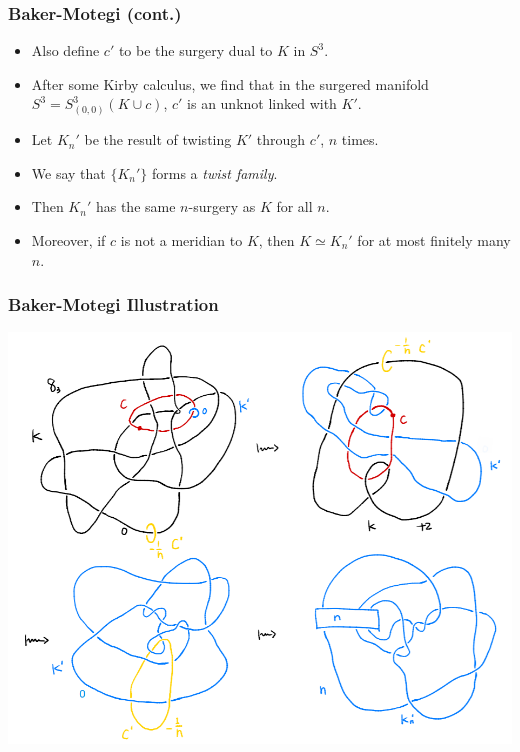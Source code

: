 \documentclass{beamer}
\theoremstyle{ex}
\theoremstyle{rem}
\begin{document}
	\begin{frame}
		\frametitle{Baker-Motegi (cont.)}
		\begin{itemize}
			
			\item Also define $c'$ to be the surgery dual to $K$ in $S^3$.
			
			\item After some Kirby calculus, we find that in the surgered manifold $S^3=S^3_{(0,0)}(K\cup c)$, $c'$ is an unknot linked with $K'$.
			
			\item Let $K_n'$ be the result of twisting $K'$ through $c'$, $n$ times.
			
			\item We say that $\{K_n'\}$ forms a \textit{twist family}.
			
			\item Then $K_n'$ has the same $n$-surgery as $K$ for all $n$.
			
			\item Moreover, if $c$ is not a meridian to $K$, then $K\simeq K_n'$ for at most finitely many $n$.
		\end{itemize}
	\end{frame}

	\begin{frame}
		\frametitle{Baker-Motegi Illustration}
		\begin{center}
			\includegraphics[scale=0.5]{bm}
		\end{center}
	\end{frame}
\end{document}
